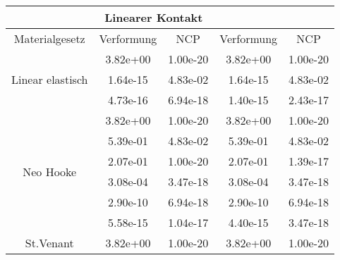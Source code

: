 \begin{table} 
\centering 
\begin{tabular}{c|cc|cc|} 
\cline{2-5} 
 & \multicolumn{2}{|c|}{Linearer Kontakt} &  \\ 
\hline 
\multicolumn{1}{|c|}{Materialgesetz} & \multicolumn{1}{c|}{Verformung} & \multicolumn{1}{c|}{NCP} & \multicolumn{1}{c|}{Verformung} & \multicolumn{1}{c|}{NCP} \\ 
\hline 
\multicolumn{1}{|c|}{\multirow{3}{*}{Linear elastisch}} &\multicolumn{1}{|c|}{  3.82e+00} & \multicolumn{1}{|c|}{  1.00e-20} & \multicolumn{1}{|c|}{  3.82e+00} & \multicolumn{1}{|c|}{  1.00e-20} \\ 
\multicolumn{1}{|c|}{} & \multicolumn{1}{|c|}{  1.64e-15} & \multicolumn{1}{|c|}{  4.83e-02} & \multicolumn{1}{|c|}{  1.64e-15} & \multicolumn{1}{|c|}{  4.83e-02} \\ 
\multicolumn{1}{|c|}{} & \multicolumn{1}{|c|}{  4.73e-16} & \multicolumn{1}{|c|}{  6.94e-18} & \multicolumn{1}{|c|}{  1.40e-15} & \multicolumn{1}{|c|}{  2.43e-17} \\ 
\hline 
\multicolumn{1}{|c|}{\multirow{6}{*}{Neo Hooke}} &\multicolumn{1}{|c|}{  3.82e+00} & \multicolumn{1}{|c|}{  1.00e-20} & \multicolumn{1}{|c|}{  3.82e+00} & \multicolumn{1}{|c|}{  1.00e-20} \\ 
\multicolumn{1}{|c|}{} & \multicolumn{1}{|c|}{  5.39e-01} & \multicolumn{1}{|c|}{  4.83e-02} & \multicolumn{1}{|c|}{  5.39e-01} & \multicolumn{1}{|c|}{  4.83e-02} \\ 
\multicolumn{1}{|c|}{} & \multicolumn{1}{|c|}{  2.07e-01} & \multicolumn{1}{|c|}{  1.00e-20} & \multicolumn{1}{|c|}{  2.07e-01} & \multicolumn{1}{|c|}{  1.39e-17} \\ 
\multicolumn{1}{|c|}{} & \multicolumn{1}{|c|}{  3.08e-04} & \multicolumn{1}{|c|}{  3.47e-18} & \multicolumn{1}{|c|}{  3.08e-04} & \multicolumn{1}{|c|}{  3.47e-18} \\ 
\multicolumn{1}{|c|}{} & \multicolumn{1}{|c|}{  2.90e-10} & \multicolumn{1}{|c|}{  6.94e-18} & \multicolumn{1}{|c|}{  2.90e-10} & \multicolumn{1}{|c|}{  6.94e-18} \\ 
\multicolumn{1}{|c|}{} & \multicolumn{1}{|c|}{  5.58e-15} & \multicolumn{1}{|c|}{  1.04e-17} & \multicolumn{1}{|c|}{  4.40e-15} & \multicolumn{1}{|c|}{  3.47e-18} \\ 
\hline 
\multicolumn{1}{|c|}{\multirow{6}{*}{St.Venant}} &\multicolumn{1}{|c|}{  3.82e+00} & \multicolumn{1}{|c|}{  1.00e-20} & \multicolumn{1}{|c|}{  3.82e+00} & \multicolumn{1}{|c|}{  1.00e-20} \\ 

\end{tabular}
\end{table}
